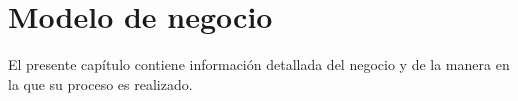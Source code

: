 
\chapter{Modelo de negocio}
	
	
	El presente capítulo contiene información detallada del negocio y de la manera en la que su proceso es realizado. 
	

	
	
	
